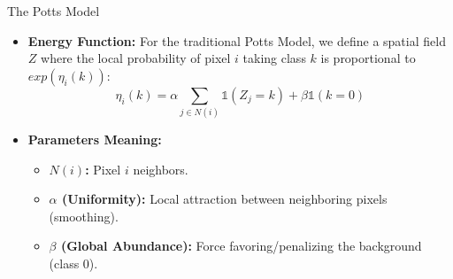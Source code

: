 \documentclass[
  ignorenonframetext,
]{beamer}
\providecommand{\tightlist}{%
  \setlength{\itemsep}{0pt}\setlength{\parskip}{0pt}}\usepackage{longtable,booktabs,array}
\begin{document}
\begin{frame}{The Potts Model}
\label{the-potts-model-1}
\begin{itemize}
\tightlist
\item
  \textbf{Energy Function:} For the traditional Potts Model, we define a
  spatial field \(Z\) where the local probability of pixel \(i\) taking
  class \(k\) is proportional to \(exp(\eta_i(k))\):
  \[\eta_i(k) = \alpha \sum_{j \in N(i)} \mathds{1}(Z_j = k) + \beta \mathds{1}(k = 0)\]
\item
  \textbf{Parameters Meaning:}

  \begin{itemize}
  \tightlist
  \item
    \textbf{\(N(i)\):} Pixel \(i\) neighbors.
  \item
    \textbf{\(\alpha\) (Uniformity):} Local attraction between
    neighboring pixels (smoothing).
  \item
    \textbf{\(\beta\) (Global Abundance):} Force favoring/penalizing the
    background (class \(0\)).
  \end{itemize}
\end{itemize}
\end{frame}
\end{document}
